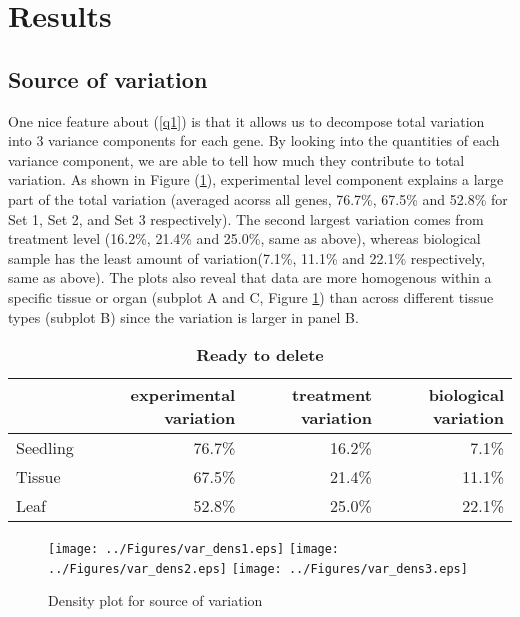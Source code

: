 \documentclass[11pt, a4paper]{article}
\begin{document}
 \section{Results}

  \subsection{Source of variation}
 One nice feature about (\ref{q1}) is that it allows us to decompose total variation into 3 variance components for each gene. By looking into the quantities of each variance component, we are able to tell how much they contribute to total variation.  As shown in Figure (\ref{densityplot}), experimental level component explains a large part of the total variation (averaged acorss all genes, 76.7\%, 67.5\% and 52.8\%  for Set 1, Set 2, and Set 3 respectively).  The second largest variation comes from treatment level (16.2\%, 21.4\% and 25.0\%, same as above), whereas biological sample has the least amount of variation(7.1\%, 11.1\% and 22.1\% respectively, same as above).  The plots also reveal that data are more homogenous within a specific tissue or organ (subplot A and C, Figure \ref{densityplot}) than across different tissue types (subplot B) since the variation is larger in panel B.  

\begin{center}
\begin{table}[h]
\begin{tabular}{lrrr} \hline
&experimental variation & treatment variation & biological variation  \\  \hline
Seedling  &76.7\% &16.2\% &7.1\%  \\
   Tissue  &67.5\% &21.4\% &11.1\%  \\
     Leaf   &52.8\% &25.0\% &22.1\% \\ \hline
\end{tabular}
\caption{\textbf{Ready to delete}}
\label{table:percentageofvariation}
\end{table}
\end{center} 
 
 \begin{figure}[h]
\begin{center}
\caption{\label{densityplot} Density plot for source of variation}
\texttt{[image: ../Figures/var\_dens1.eps]}
\texttt{[image: ../Figures/var\_dens2.eps]}
\texttt{[image: ../Figures/var\_dens3.eps]}
\end{center}
\end{figure} 
\end{document}
